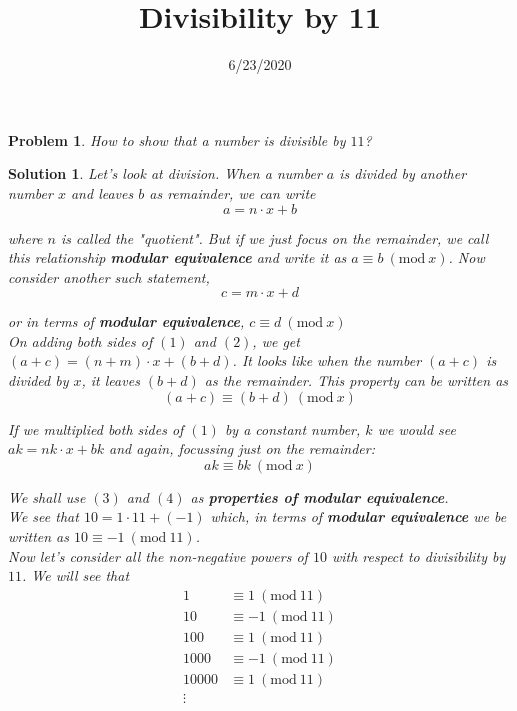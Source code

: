 \documentclass{article}
\title{Divisibility by 11}
\date{6/23/2020}
\newtheorem*{problem*}{Problem}
\newtheorem*{solution*}{Solution}
\newcommand{\Mod}[1]{\ (\mathrm{mod}\ #1)}
\begin{document}
\maketitle
 
\begin{problem*}
    How to show that a number is divisible by $11$?
\end{problem*}

\begin{solution*}
    Let's look at division. When a number $a$ is divided by another
    number $x$ and leaves $b$ as remainder, we can write
    \begin{equation}
        a = n \cdot x + b
    \end{equation}
    
    where $n$ is called the "quotient". But if we just focus on the 
    remainder, we call this relationship \textbf{modular equivalence}
    and write it as $a \equiv b \Mod x$. Now consider another such statement,
    \begin{equation}
        c = m \cdot x + d
    \end{equation}

    or in terms of \textbf{modular equivalence},
    $c \equiv d \Mod x$\\

    On adding both sides of $(1)$ and $(2)$, we get 
    $(a+c) = (n+m) \cdot x + (b+d)$. It looks like
    when the number $(a+c)$ is divided by $x$, it leaves
    $(b+d)$ as the remainder. This property can be written as
    \begin{equation}
        (a+c) \equiv (b+d) \Mod x
    \end{equation}

    If we multiplied both sides of $(1)$ by a constant number, $k$
    we would see $ak = nk \cdot x + bk$ and again, focussing just on the remainder:
    \begin{equation}
        ak \equiv bk \Mod x
    \end{equation}

    We shall use $(3)$ and $(4)$ as \textbf{properties of modular equivalence}.\\

    We see that $10 = 1 \cdot 11 + (-1)$ which, in terms of
    \textbf{modular equivalence} we be written as 
    $10 \equiv -1 \Mod {11}$.\\

    Now let's consider all the non-negative powers of $10$
    with respect to divisibility by $11$. We will see that
    \begin{align*}
        1 &\equiv 1 \Mod {11}\\
        10 &\equiv -1 \Mod {11}\\
        100 &\equiv 1 \Mod {11}\\
        1000 &\equiv -1 \Mod {11}\\
        10000 &\equiv 1 \Mod {11}\\
        \vdots\\
    \end{align*}


\end{solution*}
\end{document}
